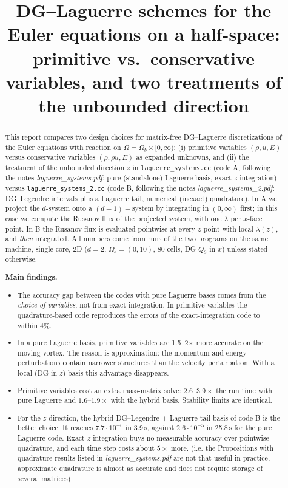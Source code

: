\documentclass[11pt,a4paper]{article}
\title{DG--Laguerre schemes for the Euler equations on a half-space:\\[2pt]
\large primitive vs.\ conservative variables, and two treatments of the unbounded direction}
\author{}
\newcommand{\code}[1]{\texttt{#1}}
\begin{document}
\maketitle

\begin{abstract}
\noindent This report compares two design choices for matrix-free DG--Laguerre
discretizations of the Euler equations with reaction on
$\Omega=\Omega_b\times[0,\infty)$: (i) primitive variables $(\rho,u,E)$ versus
conservative variables $(\rho,\rho u,E)$ as expanded unknowns, and (ii) the
treatment of the unbounded direction $z$ in \code{laguerre\_systems.cc} (code A, following the notes
\emph{laguerre\_systems.pdf}: pure (standalone)
Laguerre basis, exact $z$-integration) versus \code{laguerre\_systems\_2.cc} (code B, following the notes
\emph{laguerre\_systems\_2.pdf}: DG--Legendre
intervals plus a Laguerre tail, numerical (inexact) quadrature). In A we project the $d$-system onto a $(d-1)-$system by integrating in $(0,\infty)$ first; in this case we compute the Rusanov flux of the projected system, with one $\lambda$ per $x$-face point. In B the Rusanov flux is evaluated pointwise at every $z$-point with local $\lambda(z)$, and \emph{then} integrated. All numbers come from runs
of the two programs on the same machine, single core, 2D ($d=2$, $\Omega_b=(0,10)$,
80 cells, DG $Q_3$ in $x$) unless stated otherwise.

\smallskip\noindent\textbf{Main findings.}
\begin{itemize}
\item The accuracy gap between the codes with pure Laguerre bases comes from the
  \emph{choice of variables}, not from exact integration. In primitive variables the
  quadrature-based code reproduces the errors of the exact-integration code to
  within 4\%.
\item In a pure Laguerre basis, primitive variables are 1.5--2$\times$ more
  accurate on the moving vortex. The reason is approximation: the momentum and
  energy perturbations contain narrower structures than the velocity perturbation.
  With a local (DG-in-$z$) basis this advantage disappears.
\item Primitive variables cost an extra mass-matrix solve: $2.6$--$3.9\times$ the run
  time with pure Laguerre and $1.6$--$1.9\times$ with the hybrid basis. Stability limits are
  identical.
\item For the $z$-direction, the hybrid DG--Legendre $+$ Laguerre-tail basis of
  code B is the better choice. It reaches $7.7\cdot10^{-6}$ in
  3.9\,s, against $2.6\cdot10^{-5}$ in 25.8\,s for the pure Laguerre code. Exact
  $z$-integration buys no measurable accuracy over pointwise quadrature, and each
  time step costs about $5\times$ more. (i.e. the Propositions with quadrature results listed in \emph{laguerre\_systems.pdf} are not that useful in practice, approximate quadrature is almost as accurate and does not require storage of several matrices)
\end{itemize}
\end{abstract}
\end{document}
